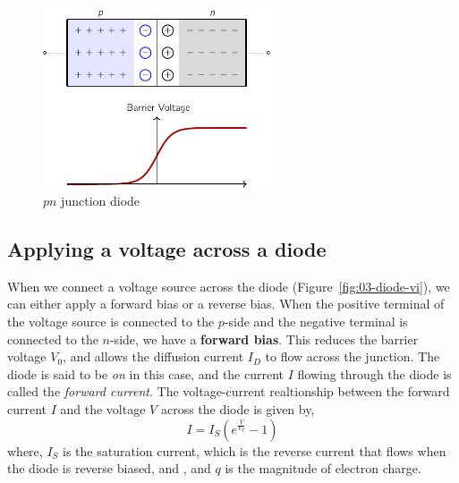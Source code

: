 \begin{figure}[t]
    \centering
    \includegraphics[width=0.6\textwidth]{figures/ch03/fig03-02.pdf}
    \caption{$pn$ junction diode}
    \label{fig:03-02}
\end{figure}

\subsection{Applying a voltage across a diode}
When we connect a voltage source across the diode (Figure~\ref{fig:03-diode-vi}), we can either apply a forward bias or a reverse bias. When the positive terminal of the voltage source is connected to the $p$-side and the negative terminal is connected to the $n$-side, we have a \textbf{forward bias}. This reduces the barrier voltage $V_0$, and allows the diffusion current $I_D$ to flow across the junction. The diode is said to be \textit{on} in this case, and the current $I$ flowing through the diode is called the \textit{forward current}. The voltage-current realtionship between the forward current $I$ and the voltage $V$ across the diode is given by,
\begin{equation}
    I = I_S \left( e^{\frac{V}{V_T}} - 1 \right)
    \label{eq:ch03-forward-bias-vi}
\end{equation}
where, $I_S$ is the saturation current, which is the reverse current that flows when the diode is reverse biased, and , and $q$ is the magnitude of electron charge.

